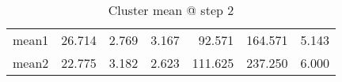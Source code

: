 \begin{table}[htbp]
  \centering
  \caption{Cluster mean @ step 2}
    \begin{tabular}{rrrrrrr}
    \toprule
    mean1 & 26.714  & 2.769  & 3.167  & 92.571  & 164.571  & 5.143  \\
    mean2 & 22.775  & 3.182  & 2.623  & 111.625  & 237.250  & 6.000  \\
    \bottomrule
    \end{tabular}%
  \label{tab:mean_a2}%
\end{table}%
